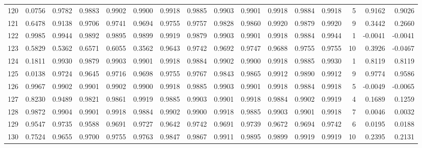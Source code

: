 \begin{tabular}{lrrrrrrrrrrrrrrr}
120 &      0.0756 &  0.9782 &  0.9883 &  0.9902 &  0.9900 &  0.9918 &  0.9885 &  0.9903 &  0.9901 &  0.9918 &   0.9884 &     0.9918 &      5 &                    0.9162 &                     0.9026 \\
121 &      0.6478 &  0.9138 &  0.9706 &  0.9741 &  0.9694 &  0.9755 &  0.9757 &  0.9828 &  0.9860 &  0.9920 &   0.9879 &     0.9920 &      9 &                    0.3442 &                     0.2660 \\
122 &      0.9985 &  0.9944 &  0.9892 &  0.9895 &  0.9899 &  0.9919 &  0.9879 &  0.9903 &  0.9901 &  0.9918 &   0.9884 &     0.9944 &      1 &                   -0.0041 &                    -0.0041 \\
123 &      0.5829 &  0.5362 &  0.6571 &  0.6055 &  0.3562 &  0.9643 &  0.9742 &  0.9692 &  0.9747 &  0.9688 &   0.9755 &     0.9755 &     10 &                    0.3926 &                    -0.0467 \\
124 &      0.1811 &  0.9930 &  0.9879 &  0.9903 &  0.9901 &  0.9918 &  0.9884 &  0.9902 &  0.9900 &  0.9918 &   0.9885 &     0.9930 &      1 &                    0.8119 &                     0.8119 \\
125 &      0.0138 &  0.9724 &  0.9645 &  0.9716 &  0.9698 &  0.9755 &  0.9767 &  0.9843 &  0.9865 &  0.9912 &   0.9890 &     0.9912 &      9 &                    0.9774 &                     0.9586 \\
126 &      0.9967 &  0.9902 &  0.9901 &  0.9902 &  0.9900 &  0.9918 &  0.9885 &  0.9903 &  0.9901 &  0.9918 &   0.9884 &     0.9918 &      5 &                   -0.0049 &                    -0.0065 \\
127 &      0.8230 &  0.9489 &  0.9821 &  0.9861 &  0.9919 &  0.9885 &  0.9903 &  0.9901 &  0.9918 &  0.9884 &   0.9902 &     0.9919 &      4 &                    0.1689 &                     0.1259 \\
128 &      0.9872 &  0.9904 &  0.9901 &  0.9918 &  0.9884 &  0.9902 &  0.9900 &  0.9918 &  0.9885 &  0.9903 &   0.9901 &     0.9918 &      7 &                    0.0046 &                     0.0032 \\
129 &      0.9547 &  0.9735 &  0.9588 &  0.9691 &  0.9727 &  0.9642 &  0.9742 &  0.9691 &  0.9739 &  0.9672 &   0.9694 &     0.9742 &      6 &                    0.0195 &                     0.0188 \\
130 &      0.7524 &  0.9655 &  0.9700 &  0.9755 &  0.9763 &  0.9847 &  0.9867 &  0.9911 &  0.9895 &  0.9899 &   0.9919 &     0.9919 &     10 &                    0.2395 &                     0.2131 \\

\end{tabular}
